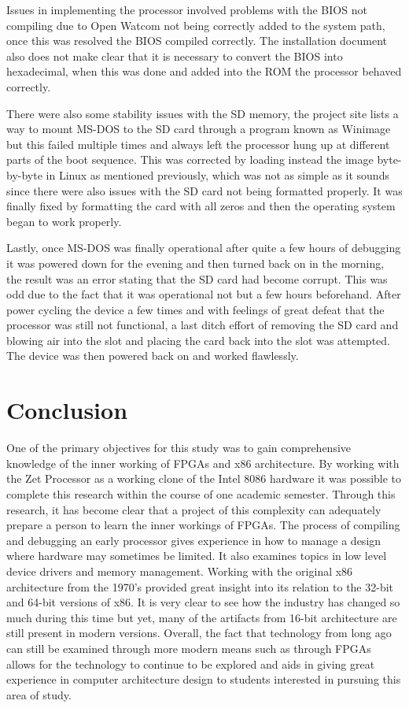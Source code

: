 \documentclass[11pt,peerreview, onecolumn]{IEEEtran}
\begin{document}
Issues in implementing the processor involved problems with the BIOS not compiling due to Open Watcom not being correctly added to the system path, once this was resolved the BIOS compiled correctly. The installation document also does not make clear that it is necessary to convert the BIOS into hexadecimal, when this was done and added into the ROM the processor behaved correctly. 

There were also some stability issues with the SD memory, the project site lists a way to mount MS-DOS to the SD card through a program known as Winimage but this failed multiple times and always left the processor hung up at different parts of the boot sequence. This was corrected by loading instead the image byte-by-byte in Linux as mentioned previously, which was not as simple as it sounds since there were also issues with the SD card not being formatted properly. It was finally fixed by formatting the card with all zeros and then the operating system began to work properly.

Lastly, once MS-DOS was finally operational after quite a few hours of debugging it was powered down for the evening and then turned back on in the morning, the result was an error stating that the SD card had become corrupt. This was odd due to the fact that it was operational not but a few hours beforehand. After power cycling the device a few times and with feelings of great defeat that the processor was still not functional, a last ditch effort of removing the SD card and blowing air into the slot and placing the card back into the slot was attempted. The device was then powered back on and worked flawlessly.

\section{Conclusion}
One of the primary objectives for this study was to gain comprehensive knowledge of the inner working of FPGAs and x86 architecture. By working with the Zet Processor as a working clone of the Intel 8086 hardware it was possible to complete this research within the course of one academic semester. Through this research, it has become clear that a project of this complexity can adequately prepare a person to learn the inner workings of FPGAs. The process of compiling and debugging an early processor gives experience in how to manage a design where hardware may sometimes be limited. It also examines topics in low level device drivers and memory management. Working with the original x86 architecture from the 1970's provided great insight into its relation to the 32-bit and 64-bit versions of x86. It is very clear to see how the industry has changed so much during this time but yet, many of the artifacts from 16-bit architecture are still present in modern versions. Overall, the fact that technology from long ago can still be examined through more modern means such as through FPGAs allows for the technology to continue to be explored and aids in giving great experience in computer architecture design to students interested in pursuing this area of study.
\end{document}
